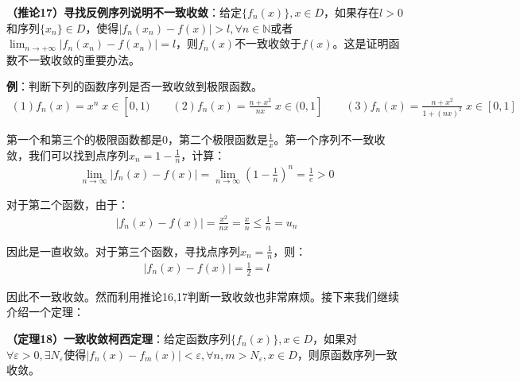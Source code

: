 \documentclass{ctexart}
\let\oldtextbf\textbf
\renewcommand{\textbf}[1]{\textcolor{brown!50!red}{\oldtextbf{#1}}}
\begin{document}
\begin{tcolorbox}[
    colback=bac2,     %
    colframe=fra2,   %
    coltitle=white,             %
    coltext=tex2,
    title=利用反例序列说明不一致收敛,
    fonttitle=\bfseries,        %
arc=3mm,                     %
breakable
]
\textbf{\color{brown!50!red}（推论17）寻找反例序列说明不一致收敛}：给定$\{f_n(x)\},x\in D$，如果存在$l>0$和序列$\{x_n\}\in D$，使得$|f_n(x_n)-f(x)|>l,\forall n\in\mathbb{N}$或者$\lim_{n\to+\infty}|f_n(x_n)-f(x_n)|=l$，则$f_n(x)$不一致收敛于$f(x)$。这是证明函数不一致收敛的重要办法。
\end{tcolorbox}


\textbf{\color{brown!50!red}例}：判断下列的函数序列是否一致收敛到极限函数。
\begin{align*}
    (1)f_n(x)=x^n\;x\in[0,1)\qquad
    (2)f_n(x)=\frac{n+x^2}{nx}\; x\in(0,1]\qquad
    (3)f_n(x)=\frac{n+x^2}{1+(nx)^2}\;x\in[0,1]
\end{align*}

第一个和第三个的极限函数都是0，第二个极限函数是$\frac{1}{x}$。第一个序列不一致收敛，我们可以找到点序列$x_n=1-\frac{1}{n}$，计算：
\begin{align*}
    \lim_{n\to\infty}|f_n(x)-f(x)|=\lim_{n\to\infty}(1-\frac{1}{n})^n=\frac{1}{e}>0
\end{align*}

对于第二个函数，由于：
\begin{align*}
    |f_n(x)-f(x)|=\frac{x^2}{nx}=\frac{x}{n}\leq\frac{1}{n}=u_n
\end{align*}

因此是一直收敛。对于第三个函数，寻找点序列$x_n=\frac{1}{n}$，则：
\begin{align*}
    |f_n(x)-f(x)|=\frac{1}{2}=l
\end{align*}

因此不一致收敛。然而利用推论16,17判断一致收敛也非常麻烦。接下来我们继续介绍一个定理：
\begin{tcolorbox}[
    colback=bac2,     %
    colframe=fra2,   %
    coltitle=white,             %
    coltext=tex2,
    title=一致收敛柯西定理,
    fonttitle=\bfseries,        %
arc=3mm,                     %
breakable
]
\textbf{\color{brown!50!red}（定理18）一致收敛柯西定理}：给定函数序列$\{f_n(x)\},x\in D$，如果对$\forall \varepsilon>0,\exists N_\varepsilon$使得$|f_n(x)-f_m(x)|<\varepsilon,\forall n,m>N_\varepsilon,x\in D$，则原函数序列一致收敛。
\end{tcolorbox}
\end{document}
